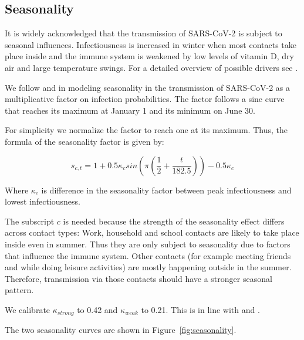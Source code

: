 \FloatBarrier

\subsection{Seasonality}
\label{subsec:seasonality}

It is widely acknowledged that the transmission of SARS-CoV-2 is subject to seasonal
influences. Infectiousness is increased in winter when most contacts take place inside
and the immune system is weakened by low levels of vitamin D, dry air and large
temperature swings. For a detailed overview of possible drivers see
\cite{KronfeldSchor2021}.

We follow \cite{Kuehn2020} and \cite{Gavenciak2021} in modeling seasonality in the
transmission of SARS-CoV-2 as a multiplicative factor on infection probabilities. The
factor follows a sine curve that reaches its maximum at January 1 and its minimum
on June 30.

For simplicity we normalize the factor to reach one at its maximum. Thus, the formula of
the seasonality factor is given by:

\begin{equation}
\label{eq:seasonality}
    s_{c, t} = 1 + 0.5 \kappa_c  sin \left ( \pi  \left (\frac{1}{2} + \frac{t}{182.5}\right ) \right ) - 0.5 \kappa_c
\end{equation}

Where $\kappa_c$ is difference in the seasonality factor between peak infectiousness
and lowest infectiousness.

The subscript $c$ is needed because the strength of the seasonality effect differs
across contact types: Work, household and school contacts are likely to take place
inside even in summer. Thus they are only subject to seasonality due to factors that
influence the immune system. Other contacts (for example meeting friends and while doing
leisure activities) are mostly happening outside in the summer. Therefore, transmission
via those contacts should have a stronger seasonal pattern.

We calibrate $\kappa_{strong}$ to 0.42 and $\kappa_{weak}$ to 0.21. This is in line with
\cite{Gavenciak2021} and \cite{Kuehn2020}.

The two seasonality curves are shown in Figure~\ref{fig:seasonality}.

